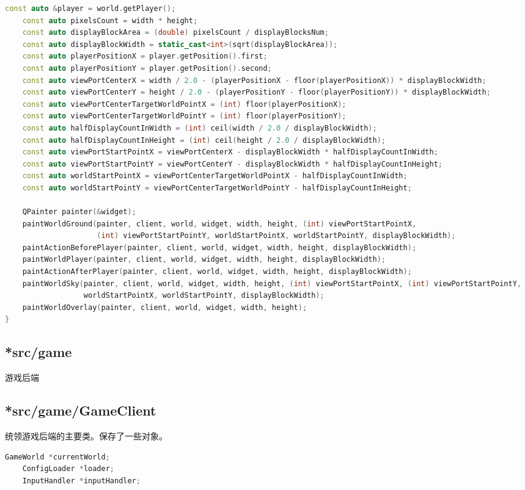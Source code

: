 \documentclass[a4paper,12pt]{report}
\begin{document}
\begin{spacing}{1.5}
\begin{lstlisting}[language={C++}]
    const auto &player = world.getPlayer();
    const auto pixelsCount = width * height;
    const auto displayBlockArea = (double) pixelsCount / displayBlocksNum;
    const auto displayBlockWidth = static_cast<int>(sqrt(displayBlockArea));
    const auto playerPositionX = player.getPosition().first;
    const auto playerPositionY = player.getPosition().second;
    const auto viewPortCenterX = width / 2.0 - (playerPositionX - floor(playerPositionX)) * displayBlockWidth;
    const auto viewPortCenterY = height / 2.0 - (playerPositionY - floor(playerPositionY)) * displayBlockWidth;
    const auto viewPortCenterTargetWorldPointX = (int) floor(playerPositionX);
    const auto viewPortCenterTargetWorldPointY = (int) floor(playerPositionY);
    const auto halfDisplayCountInWidth = (int) ceil(width / 2.0 / displayBlockWidth);
    const auto halfDisplayCountInHeight = (int) ceil(height / 2.0 / displayBlockWidth);
    const auto viewPortStartPointX = viewPortCenterX - displayBlockWidth * halfDisplayCountInWidth;
    const auto viewPortStartPointY = viewPortCenterY - displayBlockWidth * halfDisplayCountInHeight;
    const auto worldStartPointX = viewPortCenterTargetWorldPointX - halfDisplayCountInWidth;
    const auto worldStartPointY = viewPortCenterTargetWorldPointY - halfDisplayCountInHeight;

    QPainter painter(&widget);
    paintWorldGround(painter, client, world, widget, width, height, (int) viewPortStartPointX,
                     (int) viewPortStartPointY, worldStartPointX, worldStartPointY, displayBlockWidth);
    paintActionBeforePlayer(painter, client, world, widget, width, height, displayBlockWidth);
    paintWorldPlayer(painter, client, world, widget, width, height, displayBlockWidth);
    paintActionAfterPlayer(painter, client, world, widget, width, height, displayBlockWidth);
    paintWorldSky(painter, client, world, widget, width, height, (int) viewPortStartPointX, (int) viewPortStartPointY,
                  worldStartPointX, worldStartPointY, displayBlockWidth);
    paintWorldOverlay(painter, client, world, widget, width, height);
}
\end{lstlisting}
\subsection{\textbf{*src/game}}
游戏后端
\subsection{\textbf{*src/game/GameClient}}
统领游戏后端的主要类。保存了一些对象。
\begin{lstlisting}[language={C++}]
    GameWorld *currentWorld;
    ConfigLoader *loader;
    InputHandler *inputHandler;
\end{lstlisting}

\end{spacing}
\end{document}
